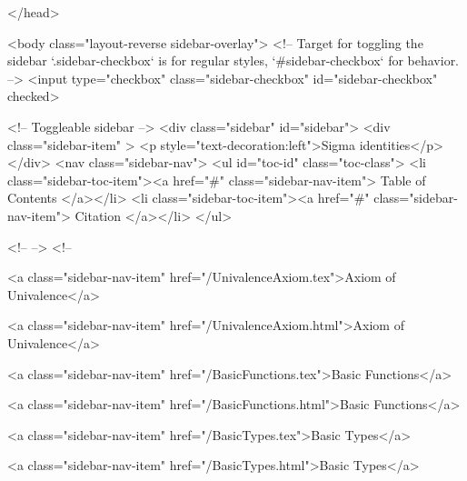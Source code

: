   
</head>




  <body class="layout-reverse sidebar-overlay">
    <!-- Target for toggling the sidebar `.sidebar-checkbox` is for regular
     styles, `#sidebar-checkbox` for behavior. -->
<input type="checkbox" class="sidebar-checkbox" id="sidebar-checkbox" checked>

<!-- Toggleable sidebar -->
<div class="sidebar" id="sidebar">
  <div class="sidebar-item" >
    <p style="text-decoration:left">Sigma identities</p>
  </div>
  <nav class="sidebar-nav">
    <ul id="toc-id" class="toc-class">
  <li class="sidebar-toc-item"><a href="#" class="sidebar-nav-item"> Table of Contents </a></li>
  <li class="sidebar-toc-item"><a href="#" class="sidebar-nav-item"> Citation </a></li>
</ul>


    <!--  -->
    <!-- 
      
    
      
    
      
    
      
    
      
        
      
    
      
        
          <a class="sidebar-nav-item" href="/UnivalenceAxiom.tex">Axiom of Univalence</a>
        
      
    
      
        
          <a class="sidebar-nav-item" href="/UnivalenceAxiom.html">Axiom of Univalence</a>
        
      
    
      
        
          <a class="sidebar-nav-item" href="/BasicFunctions.tex">Basic Functions</a>
        
      
    
      
        
          <a class="sidebar-nav-item" href="/BasicFunctions.html">Basic Functions</a>
        
      
    
      
        
          <a class="sidebar-nav-item" href="/BasicTypes.tex">Basic Types</a>
        
      
    
      
        
          <a class="sidebar-nav-item" href="/BasicTypes.html">Basic Types</a>
        
      
    
